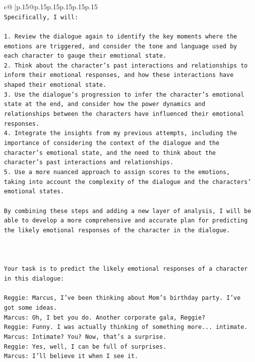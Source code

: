 \documentclass{article}
\begin{document}
{\begin{supertabular}{c@{$\;$}|p{.15\linewidth}@{}p{.15\linewidth}p{.15\linewidth}p{.15\linewidth}p{.15\linewidth}p{.15\linewidth}}
{{{\\ 
\texttt{Specifically, I will:} \\
\\ 
\texttt{1. Review the dialogue again to identify the key moments where the emotions are triggered, and consider the tone and language used by each character to gauge their emotional state.} \\
\texttt{2. Think about the character's past interactions and relationships to inform their emotional responses, and how these interactions have shaped their emotional state.} \\
\texttt{3. Use the dialogue's progression to infer the character's emotional state at the end, and consider how the power dynamics and relationships between the characters have influenced their emotional responses.} \\
\texttt{4. Integrate the insights from my previous attempts, including the importance of considering the context of the dialogue and the character's emotional state, and the need to think about the character's past interactions and relationships.} \\
\texttt{5. Use a more nuanced approach to assign scores to the emotions, taking into account the complexity of the dialogue and the characters' emotional states.} \\
\\ 
\texttt{By combining these steps and adding a new layer of analysis, I will be able to develop a more comprehensive and accurate plan for predicting the likely emotional responses of the character in the dialogue.} \\
\\ 
\\ 
\\ 
\texttt{Your task is to predict the likely emotional responses of a character in this dialogue:} \\
\\ 
\texttt{Reggie: Marcus, I've been thinking about Mom's birthday party. I've got some ideas.} \\
\texttt{Marcus: Oh, I bet you do. Another corporate gala, Reggie? } \\
\texttt{Reggie: Funny. I was actually thinking of something more... intimate. } \\
\texttt{Marcus: Intimate? You? Now, that's a surprise.} \\
\texttt{Reggie: Yes, well, I can be full of surprises. } \\
\texttt{Marcus: I'll believe it when I see it. } \\
}}}
\end{supertabular}}
\end{document}
